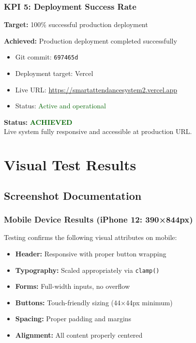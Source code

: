 \documentclass[11pt, a4paper]{report}
\begin{document}
\subsection{KPI 5: Deployment Success Rate}

\textbf{Target:} 100\% successful production deployment

\textbf{Achieved:} Production deployment completed successfully

\begin{itemize}
    \item Git commit: \texttt{697465d}
    \item Deployment target: Vercel
    \item Live URL: \url{https://smartattendancesystem2.vercel.app}
    \item Status: \textcolor{darkgreen}{Active and operational}
\end{itemize}

\textbf{Status:} \textcolor{darkgreen}{\textbf{ACHIEVED}} \\
Live system fully responsive and accessible at production URL.

\chapter{Visual Test Results}

\section{Screenshot Documentation}

\subsection{Mobile Device Results (iPhone 12: 390×844px)}

Testing confirms the following visual attributes on mobile:

\begin{itemize}
    \item \textbf{Header:} Responsive with proper button wrapping
    \item \textbf{Typography:} Scaled appropriately via \texttt{clamp()}
    \item \textbf{Forms:} Full-width inputs, no overflow
    \item \textbf{Buttons:} Touch-friendly sizing (44×44px minimum)
    \item \textbf{Spacing:} Proper padding and margins
    \item \textbf{Alignment:} All content properly centered
\end{itemize}
\end{document}
